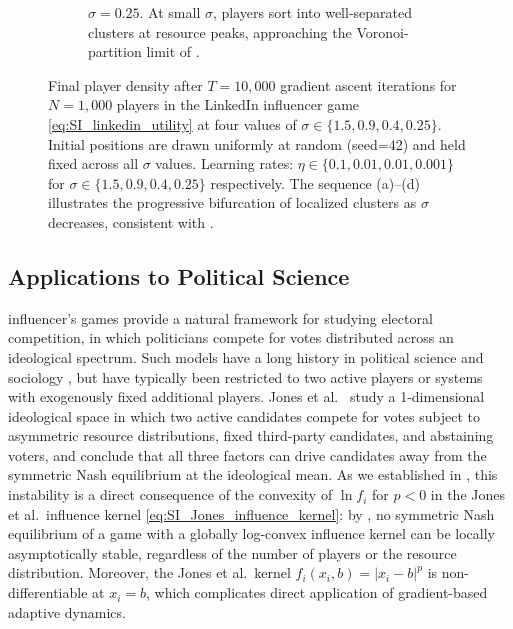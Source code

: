 \documentclass{article}
\begin{document}
\begin{figure}[ht!]
\begin{subfigure}[b]{0.45\linewidth}
            \end{subfigure}
            \begin{subfigure}[b]{0.45\linewidth}
                \centering
                
                \caption{$\sigma = 0.25$.
                    At small $\sigma$, players sort into well-separated clusters at resource peaks, approaching the Voronoi-partition limit of .}
                \label{fig:linkedin_density:d}
                \vspace{4ex}
            \end{subfigure}
            \caption{Final player density after $T = 10{,}000$ gradient ascent iterations for $N = 1{,}000$ players in the LinkedIn influencer game \cref{eq:SI_linkedin_utility} at four values of $\sigma \in \{1.5, 0.9, 0.4, 0.25\}$.
                Initial positions are drawn uniformly at random (seed=42) and held fixed across all $\sigma$ values.
                Learning rates: $\eta \in \{0.1, 0.01, 0.01, 0.001\}$ for $\sigma \in \{1.5, 0.9, 0.4, 0.25\}$ respectively.
                The sequence (a)--(d) illustrates the progressive bifurcation of localized clusters as $\sigma$ decreases, consistent with .}
            \label{fig:linkedin_density}
        \end{figure}

\clearpage

  
    \subsection{Applications to Political Science}\label{subsec:SI_political_science}


        influencer's games provide a natural framework for studying electoral competition, in which politicians compete for votes distributed across an ideological spectrum.
        Such models have a long history in political science and sociology \cite{jones2022polarization}, but have typically been restricted to two active players or systems with exogenously fixed additional players.
        Jones et al.\ \cite{jones2022polarization} study a 1-dimensional ideological space in which two active candidates compete for votes subject to asymmetric resource distributions, fixed third-party candidates, and abstaining voters, and conclude that all three factors can drive candidates away from the symmetric Nash equilibrium at the ideological mean.
        As we established in , this instability is a direct consequence of the convexity of $\ln f_i$ for $p < 0$ in the Jones et al.\ influence kernel \cref{eq:SI_Jones_influence_kernel}: by , no symmetric Nash equilibrium of a game with a globally log-convex influence kernel can be locally asymptotically stable, regardless of the number of players or the resource distribution.
        Moreover, the Jones et al.\ kernel $f_i(x_i,b) = |x_i - b|^p$ is non-differentiable at $x_i = b$, which complicates direct application of gradient-based adaptive dynamics.
\end{document}
